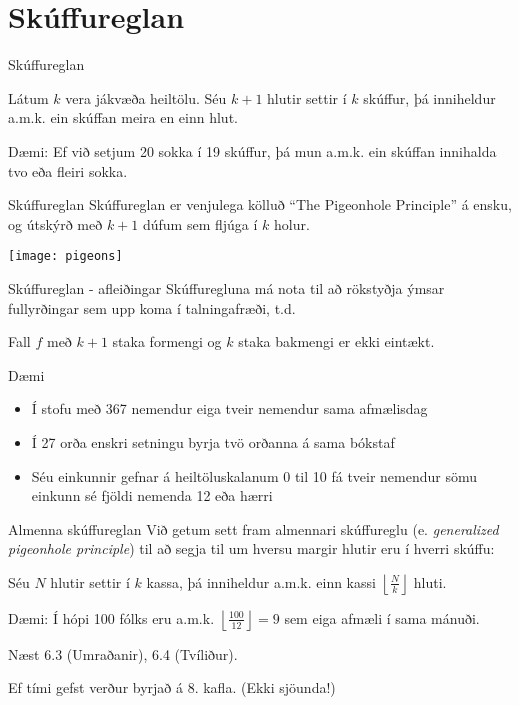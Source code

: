 \documentclass{beamer}
\begin{document}
\section{Skúffureglan}

\begin{frame}{Skúffureglan}
\begin{tcolorbox}[title=Skúffuregla Dirichlets]
Látum $k$ vera jákvæða heiltölu. Séu $k + 1$ hlutir settir í $k$ skúffur, þá inniheldur a.m.k. ein skúffan meira en einn hlut.
\end{tcolorbox}

Dæmi: Ef við setjum 20 sokka í 19 skúffur, þá mun a.m.k. ein skúffan innihalda tvo eða fleiri sokka.
\end{frame}

\begin{frame}{Skúffureglan}
Skúffureglan er venjulega kölluð ``The Pigeonhole Principle'' á ensku, og útskýrð með $k+1$ dúfum sem fljúga í $k$ holur.
\begin{center}
\texttt{[image: pigeons]}
\end{center}
\end{frame}

\begin{frame}{Skúffureglan - afleiðingar}
Skúffuregluna má nota til að rökstyðja ýmsar fullyrðingar sem upp koma í talningafræði, t.d.
\begin{tcolorbox}
Fall $f$ með $k+1$ staka formengi og $k$ staka bakmengi er ekki eintækt.
\end{tcolorbox}
\end{frame}

\begin{frame}{Dæmi}
\begin{itemize}
 \item Í stofu með 367 nemendur eiga tveir nemendur sama afmælisdag
 \item Í 27 orða enskri setningu byrja tvö orðanna á sama bókstaf
 \item Séu einkunnir gefnar á heiltöluskalanum 0 til 10 fá tveir nemendur sömu einkunn sé fjöldi nemenda 12 eða hærri
\end{itemize}
\end{frame}

\begin{frame}{Almenna skúffureglan}
Við getum sett fram almennari skúffureglu (e. \emph{generalized pigeonhole principle}) til að segja til um hversu margir hlutir eru í hverri skúffu:
\begin{tcolorbox}[title=Almenna skúffureglan]
Séu $N$ hlutir settir í $k$ kassa, þá inniheldur a.m.k. einn kassi $\left\lfloor \frac{N}{k}\right\rfloor$ hluti.
\end{tcolorbox}
Dæmi: Í hópi 100 fólks eru a.m.k. $\left\lfloor \frac{100}{12}\right\rfloor = 9$ sem eiga afmæli í sama mánuði.

\end{frame}

\begin{frame}{Næst}
6.3 (Umraðanir), 6.4 (Tvíliður).

Ef tími gefst verður byrjað á 8. kafla. (Ekki sjöunda!)
\end{frame}
\end{document}
